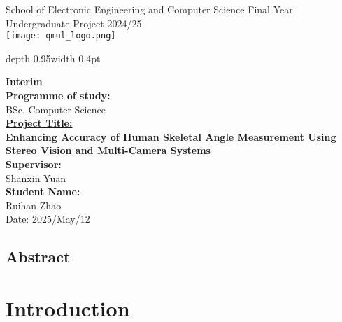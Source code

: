 \documentclass[a4paper,12pt]{article}
\renewcommand{\headrulewidth}{0.4pt}
\renewcommand{\headrulewidth}{0pt}
\newcommand{\removeheaderandfooter}{
  \pagestyle{empty}
  \fancyhead{}
  \fancyfoot{}
  \renewcommand{\headrulewidth}{0pt}
}
\begin{document}

\begin{titlepage}
\removeheaderandfooter
\noindent
\begin{minipage}[t][0.95\textheight][t]{0.48\textwidth}
\raggedright
{\fontsize{15}{18}\selectfont School of Electronic Engineering and Computer Science}
\vfill
{\fontsize{15}{18}\selectfont 
Final Year\\
Undergraduate Project 2024/25
}
\vspace{4em}\\
\texttt{[image: qmul\_logo.png]} %
\end{minipage}
\hfill
\vrule depth 0.95\textheight width 0.4pt
\hfill
\begin{minipage}[t][0.95\textheight][t]{0.48\textwidth}
\raggedright
{\fontsize{14}{17}\selectfont
\textbf{Interim}\\ %
\textbf{Programme of study:}\\
BSc. Computer Science\\[4em]
}
{\fontsize{20}{24}\selectfont \uline{\textbf{Project Title:}}\\
\textbf{Enhancing Accuracy of Human Skeletal Angle Measurement Using Stereo Vision and Multi-Camera Systems}\\[4em]
{\fontsize{14}{17}\selectfont
\textbf{Supervisor:}\\
Shanxin Yuan\\[4em]
\textbf{Student Name:}\\
Ruihan Zhao\\[4em]
\vfill
Date: 2025/May/12
}}
\end{minipage}
\end{titlepage}

\setcounter{page}{2}

\clearpage
\removeheaderandfooter
\section*{Abstract}


\clearpage
\pagestyle{plain}
\tableofcontents

\clearpage
\pagestyle{main}
\chapter{Introduction}
\end{document}

